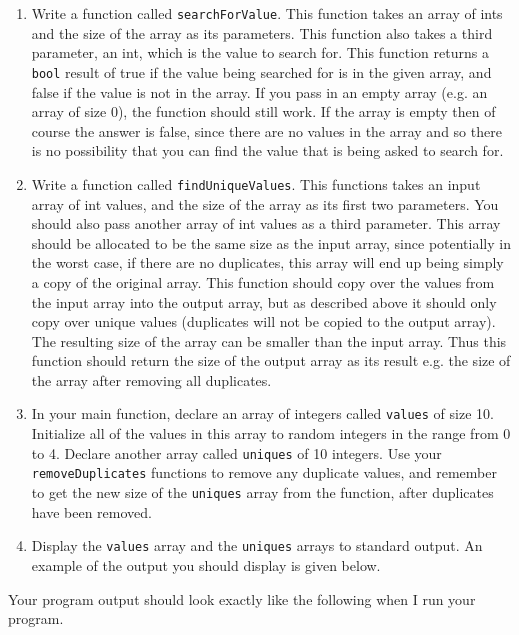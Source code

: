 \documentclass[11pt]{article}
\begin{document}
\begin{enumerate}
\item Write a function called \verb~searchForValue~.  This function takes
   an array of ints and the size of the array as its parameters.  This
   function also takes a third parameter, an int, which is the value to
   search for.  This function returns a \verb~bool~ result of true if the
   value being searched for is in the given array, and false if the
   value is not in the array.  If you pass in an empty array (e.g. an
   array of size 0), the function should still work.  If the array is
   empty then of course the answer is false, since there are no values
   in the array and so there is no possibility that you can find the
   value that is being asked to search for.
\item Write a function called \verb~findUniqueValues~.  This functions
   takes an input array of int values, and the size of the array
   as its first two parameters.  You should also pass another
   array of int values as a third parameter.  This array should
   be allocated to be the same size as the input array, since
   potentially in the worst case, if there are no duplicates,
   this array will end up being simply a copy of the original
   array.  This function should copy over the values from
   the input array into the output array, but as described above
   it should only copy over unique values (duplicates will
   not be copied to the output array).  The resulting size of
   the array can be smaller than the input array.  Thus this
   function should return the size of the output array as
   its result e.g. the size of the array after removing all
   duplicates.
\item In your main function, declare an array of integers called \verb~values~
   of size 10.  Initialize all of the values in this array to random
   integers in the range from 0 to 4.  Declare another array called
   \verb~uniques~ of 10 integers.  Use your \verb~removeDuplicates~ functions to
   remove any duplicate values, and remember to get the new size of
   the \verb~uniques~ array from the function, after duplicates have been
   removed.
\item Display the \verb~values~ array and the \verb~uniques~ arrays to standard
   output.  An example of the output you should display is given below.
\end{enumerate}

Your program output should look exactly like the following when I run
your program. 
\end{document}
